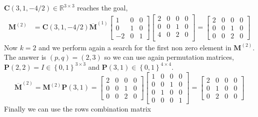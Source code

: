 \begin{example}
			$\bm{C}(3,1,-4/2)\in\mathbb{R}^{3\times 3}$ reaches the goal,
			\begin{equation}
				\begin{split}
					\bm{M}^{(2)} 	&= \bm{C}(3,1,-4/2)\overline{\bm{M}}^{(1)}  
					\begin{bmatrix}
						1 	& 	0 	& 0 \\
						0 	& 	1 	& 0 \\
						-2 	& 	0 	& 1
					\end{bmatrix} 
					\begin{bmatrix}
						2 & 0 & 0 & 0 \\
						0 & 0 & 1 & 0 \\
						4 & 0 & 2 & 0 \\
					\end{bmatrix}
					=
					\begin{bmatrix}
						2 & 0 & 0 & 0 \\
						0 & 0 & 1 & 0 \\
						0 & 0 & 2 & 0
					\end{bmatrix}
				\end{split}
			\end{equation}
			Now  $k=2$ and we perform again a search for the first non zero element 
			in $\bm{M}^{(2)}$. The answer is $(p,q)=(2,3)$ so we can use again
			permutation matrices,
			$\bm{P}(2,2) = I\in\left\lbrace0,1 \right\rbrace^{3\times 3}$ 
			and $\bm{P}(3,1)\in\left\lbrace0,1 \right\rbrace^{4\times 4}$.
			\begin{equation}
				\overline{\bm{M}}^{(2)} = \bm{M}^{(2)}\bm{P}(3,1) = \begin{bmatrix}
					2 & 0 & 0 & 0 \\
					0 & 0 & 1 & 0 \\
					0 & 0 & 2 & 0
				\end{bmatrix}
				\begin{bmatrix}
     				1 & 0 & 0 & 0 \\
     				0 & 0 & 1 & 0 \\
     				0 & 1 & 0 & 0 \\
     				0 & 0 & 0 & 1 
				\end{bmatrix}
				= 
				\begin{bmatrix}
					2 & 0 & 0 & 0 \\
					0 & 1 & 0 & 0 \\
					0 & 2 & 0 & 0 
				\end{bmatrix}
			\end{equation}
			Finally we can use the rows combination matrix

\end{example}
